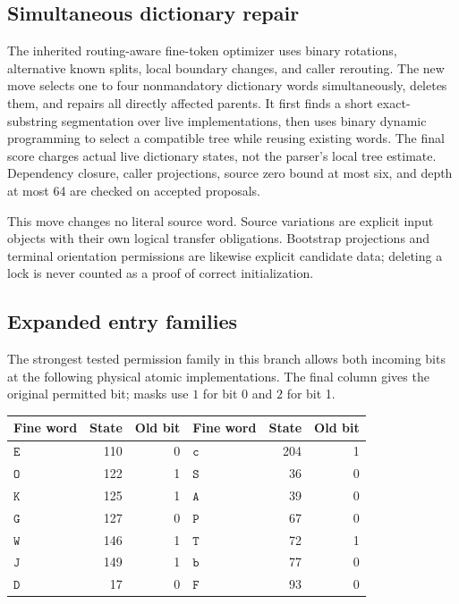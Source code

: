 \subsection{Simultaneous dictionary repair}

The inherited routing-aware fine-token optimizer uses binary rotations,
alternative known splits, local boundary changes, and caller rerouting. The
new move selects one to four nonmandatory dictionary words simultaneously,
deletes them, and repairs all directly affected parents. It first finds a
short exact-substring segmentation over live implementations, then uses binary
dynamic programming to select a compatible tree while reusing existing words.
The final score charges actual live dictionary states, not the parser's local
tree estimate. Dependency closure, caller projections, source zero bound at
most six, and depth at most 64 are checked on accepted proposals.

This move changes no literal source word. Source variations are explicit input
objects with their own logical transfer obligations. Bootstrap projections
and terminal orientation permissions are likewise explicit candidate data;
deleting a lock is never counted as a proof of correct initialization.

\subsection{Expanded entry families}

The strongest tested permission family in this branch allows both incoming
bits at the following physical atomic implementations. The final column gives
the original permitted bit; masks use $1$ for bit 0 and $2$ for bit 1.

\begin{center}
\begin{tabular}{lrr@{\qquad}lrr}
Fine word & State & Old bit & Fine word & State & Old bit\\
\hline
$\mathtt E$ & 110 & 0 & $\mathtt c$ & 204 & 1\\
$\mathtt O$ & 122 & 1 & $\mathtt S$ & 36 & 0\\
$\mathtt K$ & 125 & 1 & $\mathtt A$ & 39 & 0\\
$\mathtt G$ & 127 & 0 & $\mathtt P$ & 67 & 0\\
$\mathtt W$ & 146 & 1 & $\mathtt T$ & 72 & 1\\
$\mathtt J$ & 149 & 1 & $\mathtt b$ & 77 & 0\\
$\mathtt D$ & 17 & 0 & $\mathtt F$ & 93 & 0
\end{tabular}
\end{center}

